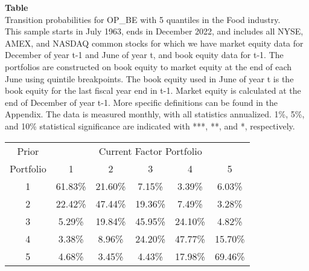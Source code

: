 \begin{table*}[ht!]
\raggedright
{}
\label{tab: transition_probs_OP_BE_Food_with_5_quantiles}
\textbf{Table \thetable} \\
Transition probabilities for OP_BE with 5 quantiles in the Food industry. \\
\hspace*{1em}This sample starts in July 1963, ends in December 2022, and includes all NYSE, AMEX, and NASDAQ common stocks for which we have market equity data for December of year t-1 and June of year t, and book equity data for t-1. The portfolios are constructed on book equity to market equity at the end of each June using quintile breakpoints.  The book equity used in June of year t is the book equity for the last fiscal year end in t-1.  Market equity is calculated at the end of December of year t-1.  More specific definitions can be found in the Appendix.  The data is measured monthly, with all statistics annualized.  1\%, 5\%, and 10\% statistical significance are indicated with ***, **, and *, respectively. \\
\vspace{0.5em}
\centering
\begin{adjustbox}{max width=\textwidth}
\begin{tabular}{@{}cccccc@{}}
\toprule
Prior & \multicolumn{5}{c}{Current Factor Portfolio} \\
Portfolio & 1 & 2 & 3 & 4 & 5 \\
\midrule
1 & 61.83\% & 21.60\% & 7.15\% & 3.39\% & 6.03\% \\
2 & 22.42\% & 47.44\% & 19.36\% & 7.49\% & 3.28\% \\
3 & 5.29\% & 19.84\% & 45.95\% & 24.10\% & 4.82\% \\
4 & 3.38\% & 8.96\% & 24.20\% & 47.77\% & 15.70\% \\
5 & 4.68\% & 3.45\% & 4.43\% & 17.98\% & 69.46\% \\
\bottomrule
\end{tabular}
\end{adjustbox}
\end{table*}